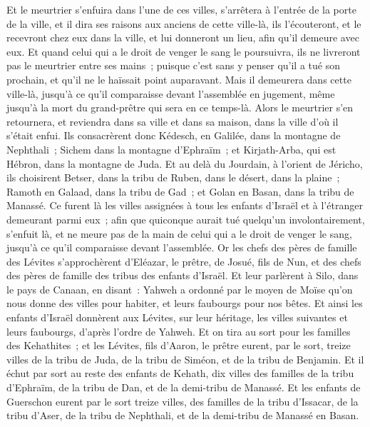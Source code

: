 \begin{multicols}{2}
Et le meurtrier s'enfuira dans l'une de ces villes, s'arrêtera à l'entrée de la porte de la ville, et il dira ses raisons aux anciens de cette ville-là, ils l'écouteront, et le recevront chez eux dans la ville, et lui donneront un lieu, afin qu'il demeure avec eux.
Et quand celui qui a le droit de venger le sang le poursuivra, ils ne livreront pas le meurtrier entre ses mains~; puisque c'est sans y penser qu'il a tué son prochain, et qu'il ne le haïssait point auparavant.
Mais il demeurera dans cette ville-là, jusqu'à ce qu'il comparaisse devant l'assemblée en jugement, même jusqu'à la mort du grand-prêtre qui sera en ce temps-là. Alors le meurtrier s'en retournera, et reviendra dans sa ville et dans sa maison, dans la ville d'où il s'était enfui.
Ils consacrèrent donc Kédesch, en Galilée, dans la montagne de Nephthali~; Sichem dans la montagne d'Ephraïm~; et Kirjath-Arba, qui est Hébron, dans la montagne de Juda.
Et au delà du Jourdain, à l'orient de Jéricho, ils choisirent Betser, dans la tribu de Ruben, dans le désert, dans la plaine~; Ramoth en Galaad, dans la tribu de Gad~; et Golan en Basan, dans la tribu de Manassé.
Ce furent là les villes assignées à tous les enfants d'Israël et à l'étranger demeurant parmi eux~; afin que quiconque aurait tué quelqu'un involontairement, s'enfuit là, et ne meure pas de la main de celui qui a le droit de venger le sang, jusqu'à ce qu'il comparaisse devant l'assemblée.
\VerseOne{}Or les chefs des pères de famille des Lévites s'approchèrent d'Eléazar, le prêtre, de Josué, fils de Nun, et des chefs des pères de famille des tribus des enfants d'Israël.
Et leur parlèrent à Silo, dans le pays de Canaan, en disant~: Yahweh a ordonné par le moyen de Moïse qu'on nous donne des villes pour habiter, et leurs faubourgs pour nos bêtes.
Et ainsi les enfants d'Israël donnèrent aux Lévites, sur leur héritage, les villes suivantes et leurs faubourgs, d'après l'ordre de Yahweh.
Et on tira au sort pour les familles des Kehathites~; et les Lévites, fils d'Aaron, le prêtre eurent, par le sort, treize villes de la tribu de Juda, de la tribu de Siméon, et de la tribu de Benjamin.
Et il échut par sort au reste des enfants de Kehath, dix villes des familles de la tribu d'Ephraïm, de la tribu de Dan, et de la demi-tribu de Manassé.
Et les enfants de Guerschon eurent par le sort treize villes, des familles de la tribu d'Issacar, de la tribu d'Aser, de la tribu de Nephthali, et de la demi-tribu de Manassé en Basan.

\end{multicols}
